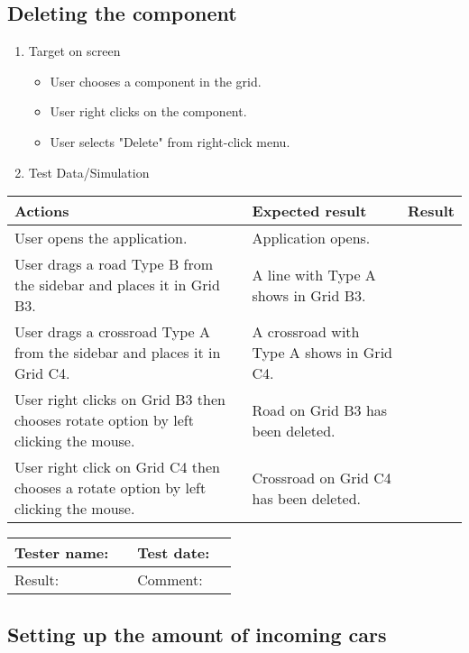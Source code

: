 \subsection{Deleting the component}

\begin{enumerate}
	
	\item Target on screen
	\begin{itemize}
		\item User chooses a component in the grid.
		\item User right clicks on the component.
		\item User selects "Delete" from right-click menu.
	\end{itemize}
	\item Test Data/Simulation
\end{enumerate}	
	\begin{tabularx}{\textwidth}{|X|X|p{2.5cm}|}\hline
		Actions & Expected result & Result \\\hline
		User opens the application.& Application opens. &  \pass \\\hline
		User drags a road Type B from the sidebar and places it in Grid B3. & A line with Type A shows in Grid B3. & \pass \\\hline
		User drags a crossroad Type A from the sidebar and places it in Grid C4. & A crossroad with Type A shows in Grid C4. & \pass \\\hline
		User right clicks on Grid B3 then chooses rotate option by left clicking the mouse.  & Road on Grid B3 has been deleted.  & \pass \\\hline
		User right click on Grid C4 then chooses a rotate option by left clicking the mouse. & Crossroad on Grid C4 has been deleted. & \pass \\\hline
	\end{tabularx}
	


\begin{tabularx}{\textwidth}{|p{3cm}X|p{3cm}X|}\hline
	Tester name: &  & Test date: & \\\hline
	Result: &   \pass & Comment: & \\\hline
\end{tabularx}

\newpage

\subsection{Setting up the amount of incoming cars }

